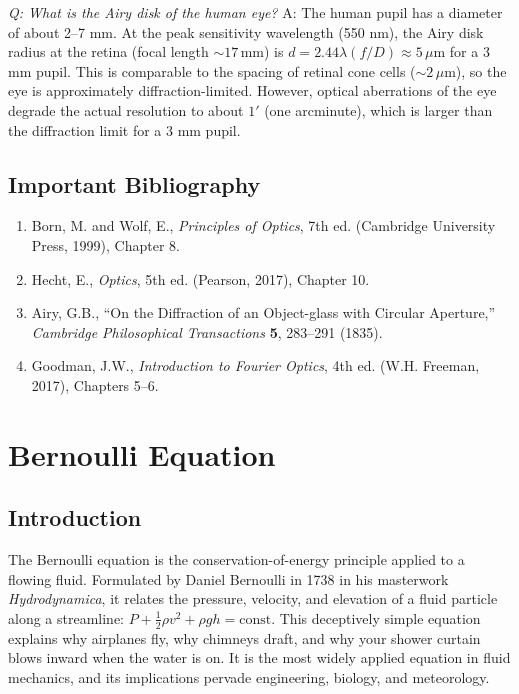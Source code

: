 \documentclass[11pt,openright]{book}
\begin{document}
\textit{Q: What is the Airy disk of the human eye?}
A: The human pupil has a diameter of about 2--7 mm. At the peak sensitivity wavelength (550 nm), the Airy disk radius at the retina (focal length $\sim 17\,\text{mm}$) is $d = 2.44\lambda(f/D) \approx 5\,\mu\text{m}$ for a 3 mm pupil. This is comparable to the spacing of retinal cone cells ($\sim 2\,\mu\text{m}$), so the eye is approximately diffraction-limited. However, optical aberrations of the eye degrade the actual resolution to about $1'$ (one arcminute), which is larger than the diffraction limit for a 3 mm pupil.
\section*{Important Bibliography}
\begin{enumerate}
\item Born, M. and Wolf, E., \textit{Principles of Optics}, 7th ed. (Cambridge University Press, 1999), Chapter 8.
\item Hecht, E., \textit{Optics}, 5th ed. (Pearson, 2017), Chapter 10.
\item Airy, G.B., ``On the Diffraction of an Object-glass with Circular Aperture,'' \textit{Cambridge Philosophical Transactions} \textbf{5}, 283--291 (1835).
\item Goodman, J.W., \textit{Introduction to Fourier Optics}, 4th ed. (W.H. Freeman, 2017), Chapters 5--6.
\end{enumerate}


\chapter{Bernoulli Equation}

\section*{Introduction}

The Bernoulli equation is the conservation-of-energy principle applied to a flowing fluid. Formulated by Daniel Bernoulli in 1738 in his masterwork \textit{Hydrodynamica}, it relates the pressure, velocity, and elevation of a fluid particle along a streamline: $P + \frac{1}{2}\rho v^2 + \rho gh = \text{const}$. This deceptively simple equation explains why airplanes fly, why chimneys draft, and why your shower curtain blows inward when the water is on. It is the most widely applied equation in fluid mechanics, and its implications pervade engineering, biology, and meteorology.
\end{document}
